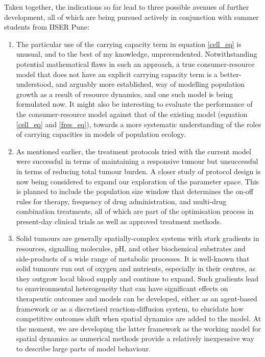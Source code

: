 \documentclass[12pt,onecolumn,twoside]{article}
\begin{document}
	Taken together, the indications so far lead to three possible avenues of further development, all of which are being pursued actively in conjunction with summer students from IISER Pune:
	\begin{enumerate}
		\item The particular use of the carrying capacity term in equation \ref{cell_eq} is unusual, and to the best of my knowledge, unprecendented. Notwithstanding potential mathematical flaws in such an approach, a true consumer-resource model that does not have an explicit carrying capacity term is a better-understood, and arguably more established, way of modelling population growth as a result of resource dynamics, and one such model is being formulated now. It might also be interesting to evaluate the performance of the consumer-resource model against that of the existing model (equation \ref{cell_eq} and \ref{fres_eq}), towards a more systematic understanding of the roles of carrying capacities in models of population ecology.
		\item As mentioned earlier, the treatment protocols tried with the current model were successful in terms of maintaining a responsive tumour but unsuccessful in terms of reducing total tumour burden. A closer study of protocol design is now being considered to expand our exploration of the parameter space. This is planned to include the population size window that determines the on-off rules for therapy, frequency of drug administration, and multi-drug combination treatments, all of which are part of the optimisation process in present-day clinical trials as well as approved treatment methods.
		\item Solid tumours are generally spatially-complex systems with stark gradients in resources, signalling molecules, pH, and other biochemical substrates and side-products of a wide range of metabolic processes. It is well-known that solid tumours run out of oxygen and nutrients, especially in their centres, as they outgrow local blood supply and continue to expand. Such gradients lead to ennvironmental heterogeneity that can have significant effects on therapeutic outcomes and models can be developed, either as an agent-based framework or as a discretised reaction-diffusion system, to elucidate how competitive outcomes shift when spatial dynamics are added to the model. At the moment, we are developing the latter framework as the working model for spatial dynamics as numerical methods provide a relatively inexpensive way to describe large parts of model behaviour.
	\end{enumerate}
\end{document}
